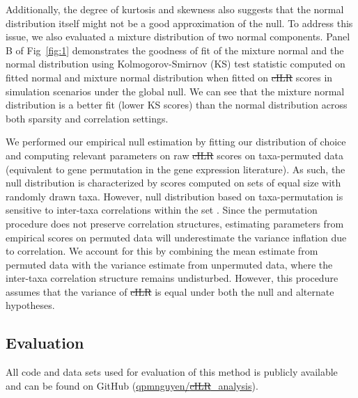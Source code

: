 \documentclass[10pt,letterpaper]{article}
\providecommand{\DIFaddtex}[1]{{\protect\color{blue}\uwave{#1}}} %
\providecommand{\DIFdeltex}[1]{{\protect\color{red}\sout{#1}}}                      %
\providecommand{\DIFaddbegin}{} %
\providecommand{\DIFaddend}{} %
\providecommand{\DIFdelbegin}{} %
\providecommand{\DIFdelend}{} %
\providecommand{\DIFadd}[1]{\texorpdfstring{\DIFaddtex{#1}}{#1}} %
\providecommand{\DIFdel}[1]{\texorpdfstring{\DIFdeltex{#1}}{}} %
\newcommand{\DIFscaledelfig}{0.5}
\newlength{\DIFdelgraphicswidth} %
\newlength{\DIFdelgraphicsheight} %
\newcommand{\DIFaddincludegraphics}[2][]{{\color{blue}\fbox{\DIFOincludegraphics[#1]{#2}}}} %
\newcommand{\DIFdelincludegraphics}[2][]{%
\sbox{\DIFdelgraphicsbox}{\DIFOincludegraphics[#1]{#2}}%
\settoboxwidth{\DIFdelgraphicswidth}{\DIFdelgraphicsbox} %
\settoboxtotalheight{\DIFdelgraphicsheight}{\DIFdelgraphicsbox} %
\scalebox{\DIFscaledelfig}{%
\parbox[b]{\DIFdelgraphicswidth}{\usebox{\DIFdelgraphicsbox}\\[-\baselineskip] \rule{\DIFdelgraphicswidth}{0em}}\llap{\resizebox{\DIFdelgraphicswidth}{\DIFdelgraphicsheight}{%
\setlength{\unitlength}{\DIFdelgraphicswidth}%
\begin{picture}(1,1)%
\thicklines\linethickness{2pt} %
{\color[rgb]{1,0,0}\put(0,0){\framebox(1,1){}}}%
{\color[rgb]{1,0,0}\put(0,0){\line( 1,1){1}}}%
{\color[rgb]{1,0,0}\put(0,1){\line(1,-1){1}}}%
\end{picture}%
}\hspace*{3pt}}} %
} %
\DeclareRobustCommand{\DIFaddbegin}{\DIFOaddbegin \let\includegraphics\DIFaddincludegraphics} %
\DeclareRobustCommand{\DIFaddend}{\DIFOaddend \let\includegraphics\DIFOincludegraphics} %
\DeclareRobustCommand{\DIFdelbegin}{\DIFOdelbegin \let\includegraphics\DIFdelincludegraphics} %
\DeclareRobustCommand{\DIFdelend}{\DIFOaddend \let\includegraphics\DIFOincludegraphics} %
\begin{document}
Additionally, the degree of kurtosis and skewness also suggests that the normal distribution itself might not be a good approximation of the null. To address this issue, we also evaluated a mixture distribution of two normal components. Panel B of Fig~\ref{fig:1} demonstrates the goodness of fit of the mixture normal and the normal distribution using Kolmogorov-Smirnov (KS) test statistic computed on fitted normal and mixture normal distribution when fitted on \DIFdelbegin \DIFdel{cILR }\DIFdelend \DIFaddbegin \DIFadd{CBEA }\DIFaddend scores in simulation scenarios under the global null. We can see that the mixture normal distribution is a better fit (lower KS scores) than the normal distribution across both sparsity and correlation settings. 

We performed our empirical null estimation by fitting our distribution of choice and computing relevant parameters on raw \DIFdelbegin \DIFdel{cILR }\DIFdelend \DIFaddbegin \DIFadd{CBEA }\DIFaddend scores on taxa-permuted data (equivalent to gene permutation in the gene expression literature). As such, the null distribution is characterized by scores computed on sets of equal size with randomly drawn taxa. However, null distribution based on taxa-permutation is sensitive to inter-taxa correlations within the set \cite{wu2012}. Since the permutation procedure does not preserve correlation structures, estimating parameters from empirical scores on permuted data will underestimate the variance inflation due to correlation. We account for this by combining the mean estimate from permuted data with the variance estimate from unpermuted data, where the inter-taxa correlation structure remains undisturbed. However, this procedure assumes that the variance of \DIFdelbegin \DIFdel{cILR }\DIFdelend \DIFaddbegin \DIFadd{CBEA }\DIFaddend is equal under both the null and alternate hypotheses. 

\subsection*{Evaluation}
All code and data sets used for evaluation of this method is publicly available and can be found on GitHub (\DIFdelbegin \href{\DIFdel{www.github.com/qpmnguyen/cILR\_analysis}}%
\DIFdelend \DIFaddbegin \href{\DIFadd{www.github.com/qpmnguyen/CBEA\_analysis}}{\DIFaddend qpmnguyen/\DIFdelbegin \DIFdel{cILR}\DIFdelend \DIFaddbegin \DIFadd{CBEA}\DIFaddend \_analysis}). 
\end{document}
